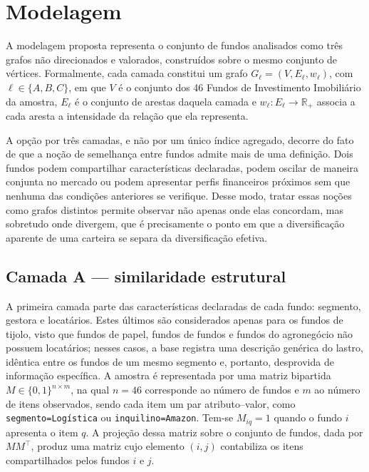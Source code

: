 %
%
%

\section{Modelagem}

A modelagem proposta representa o conjunto de fundos analisados como três
grafos não direcionados e valorados, construídos sobre o mesmo conjunto de
vértices. Formalmente, cada camada constitui um grafo
$G_\ell = (V, E_\ell, w_\ell)$, com $\ell \in \{A, B, C\}$, em que $V$ é o
conjunto dos 46 Fundos de Investimento Imobiliário da amostra, $E_\ell$ é o
conjunto de arestas daquela camada e
$w_\ell : E_\ell \rightarrow \mathbb{R}_{+}$ associa a cada aresta a
intensidade da relação que ela representa.

A opção por três camadas, e não por um único índice agregado, decorre do fato
de que a noção de semelhança entre fundos admite mais de uma definição. Dois
fundos podem compartilhar características declaradas, podem oscilar de maneira
conjunta no mercado ou podem apresentar perfis financeiros próximos sem que
nenhuma das condições anteriores se verifique. Desse modo, tratar essas noções
como grafos distintos permite observar não apenas onde elas concordam, mas
sobretudo onde divergem, que é precisamente o ponto em que a diversificação
aparente de uma carteira se separa da diversificação efetiva.

\subsection{Camada A — similaridade estrutural}

A primeira camada parte das características declaradas de cada fundo:
segmento, gestora e locatários. Estes últimos são considerados apenas para os
fundos de tijolo, visto que fundos de papel, fundos de fundos e fundos do
agronegócio não possuem locatários; nesses casos, a base registra uma
descrição genérica do lastro, idêntica entre os fundos de um mesmo segmento e,
portanto, desprovida de informação específica. A amostra é representada por
uma matriz bipartida
$M \in \{0,1\}^{n \times m}$, na qual $n = 46$ corresponde ao número de fundos
e $m$ ao número de itens observados, sendo cada item um par atributo--valor,
como \texttt{segmento=Logística} ou \texttt{inquilino=Amazon}. Tem-se
$M_{iq} = 1$ quando o fundo $i$ apresenta o item $q$. A projeção dessa matriz
sobre o conjunto de fundos, dada por $M M^{\top}$, produz uma matriz cujo
elemento $(i,j)$ contabiliza os itens compartilhados pelos fundos $i$ e $j$.

